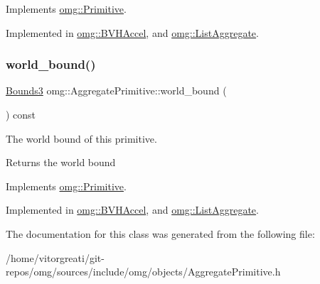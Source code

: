 Implements \mbox{\hyperlink{classomg_1_1_primitive_a139c012a57ad2322c5bef078b5d7e653}{omg\+::\+Primitive}}.



Implemented in \mbox{\hyperlink{classomg_1_1_b_v_h_accel_a110cd424f8f4d628668cb500ff3c6e7a}{omg\+::\+B\+V\+H\+Accel}}, and \mbox{\hyperlink{classomg_1_1_list_aggregate_ac3abd78ca5ce87eb3821bf19bf5194cf}{omg\+::\+List\+Aggregate}}.

\mbox{\label{classomg_1_1_aggregate_primitive_ad8a385aaa01354acffad18fe8f23fa25}} 
\subsubsection{\texorpdfstring{world\_bound()}{world\_bound()}}
{\footnotesize\ttfamily \mbox{\hyperlink{classomg_1_1_bounds3}{Bounds3}} omg\+::\+Aggregate\+Primitive\+::world\+\_\+bound (\begin{DoxyParamCaption}{ }\end{DoxyParamCaption}) const\hspace{0.3cm}{\ttfamily [pure virtual]}}



The world bound of this primitive. 

\begin{DoxyReturn}{Returns}
the world bound 
\end{DoxyReturn}


Implements \mbox{\hyperlink{classomg_1_1_primitive_a457b29547bc918cf8874b24f5168ff86}{omg\+::\+Primitive}}.



Implemented in \mbox{\hyperlink{classomg_1_1_b_v_h_accel_a8de5010cc4ddf9e0673461d711b9930b}{omg\+::\+B\+V\+H\+Accel}}, and \mbox{\hyperlink{classomg_1_1_list_aggregate_a8c7b3a6c7c8a087355a1a35519c79555}{omg\+::\+List\+Aggregate}}.



The documentation for this class was generated from the following file\+:\begin{DoxyCompactItemize}
\item 
/home/vitorgreati/git-\/repos/omg/sources/include/omg/objects/Aggregate\+Primitive.\+h\end{DoxyCompactItemize}
